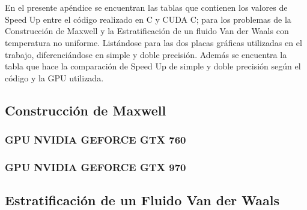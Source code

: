 \chapter{}
\label{ap1}

En el presente apéndice se encuentran las tablas que contienen 
los valores de Speed Up entre el código realizado en C y CUDA C; para los problemas de la Construcción de Maxwell y la Estratificación de un fluido Van der Waals con temperatura no uniforme.
Listándose para las dos placas gráficas utilizadas en el trabajo,
diferenciándose en simple y doble precisión.
Además se encuentra la tabla que hace la comparación de Speed Up
de simple y doble precisión según el código y la GPU utilizada.

\section{Construcción de Maxwell}
\label{apend_MxC}

\subsection{GPU NVIDIA GEFORCE GTX 760}

\label{apend_MxC_760}









\newpage

\subsection{GPU NVIDIA GEFORCE GTX 970}

\label{apend_MxC_970}










\newpage

\section{Estratificación de un Fluido Van der Waals}

